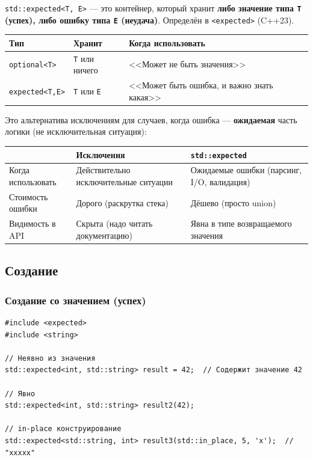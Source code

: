 \documentclass[a4paper,12pt]{article}
\begin{document}
\texttt{std::expected<T, E>} --- это контейнер, который хранит \textbf{либо
значение типа \texttt{T} (успех), либо ошибку типа \texttt{E} (неудача)}.
Определён в \texttt{<expected>} (C++23).

\begin{center}
\begin{tabular}{lp{4cm}p{4cm}}
\toprule
\textbf{Тип} & \textbf{Хранит} & \textbf{Когда использовать} \\
\midrule
\texttt{optional<T>}
    & \texttt{T} или ничего
    & <<Может не быть значения>> \\
\addlinespace
\texttt{expected<T,E>}
    & \texttt{T} или \texttt{E}
    & <<Может быть ошибка, и важно знать какая>> \\
\bottomrule
\end{tabular}
\end{center}

Это альтернатива исключениям для случаев, когда ошибка --- \textbf{ожидаемая}
часть логики (не исключительная ситуация):

\begin{center}
\begin{tabular}{lp{4.5cm}p{4.5cm}}
\toprule
& \textbf{Исключения} & \texttt{std::expected} \\
\midrule
Когда использовать
    & Действительно исключительные ситуации
    & Ожидаемые ошибки (парсинг, I/O, валидация) \\
\addlinespace
Стоимость ошибки
    & Дорого (раскрутка стека)
    & Дёшево (просто union) \\
\addlinespace
Видимость в API
    & Скрыта (надо читать документацию)
    & Явна в типе возвращаемого значения \\
\bottomrule
\end{tabular}
\end{center}

\subsection{Создание}

\subsubsection{Создание со значением (успех)}

\begin{lstlisting}
#include <expected>
#include <string>

// Неявно из значения
std::expected<int, std::string> result = 42;  // Содержит значение 42

// Явно
std::expected<int, std::string> result2(42);

// in-place конструирование
std::expected<std::string, int> result3(std::in_place, 5, 'x');  // "xxxxx"
\end{lstlisting}
\end{document}
